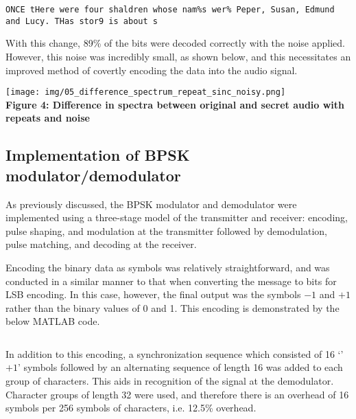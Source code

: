 \documentclass{article}
\begin{document}
\begin{verbatim}
ONCE tHere were four shaldren whose nam%s wer% Peper, Susan, Edmund 
and Lucy. THas stor9 is about s
\end{verbatim}

With this change, 89\% of the bits were decoded correctly with the noise
applied. However, this noise was incredibly small, as shown below, and this 
necessitates an improved method of covertly encoding the data into the audio
signal.

\begin{center}
  \texttt{[image: img/05\_difference\_spectrum\_repeat\_sinc\_noisy.png]} \\
  \textbf{Figure 4: Difference in spectra between original and secret audio with repeats and noise}
\end{center}

\subsection{Implementation of BPSK modulator/demodulator}

As previously discussed, the BPSK modulator and demodulator were implemented
using a three-stage model of the transmitter and receiver: encoding, pulse
shaping, and modulation at the transmitter followed by demodulation, pulse
matching, and decoding at the receiver.

\vspace{6pt}

Encoding the binary data as symbols was relatively straightforward, and was
conducted in a similar manner to that when converting the message to bits for
LSB encoding. In this case, however, the final output was the symbols $-1$ and
$+1$ rather than the binary values of 0 and 1. This encoding is demonstrated
by the below MATLAB code.

\inputminted[xleftmargin=24pt, linenos=true, breaklines, firstline=32, lastline=39]{matlab}{src/encode_message_BPSK.m}

In addition to this encoding, a synchronization sequence which consisted of 16
`'$+1$' symbols followed by an alternating sequence of length 16 was added to
each group of characters. This aids in recognition of the signal at the
demodulator. Character groups of length 32 were used, and therefore there is an
overhead of 16 symbols per 256 symbols of characters, i.e. 12.5\% overhead.

\inputminted[xleftmargin=24pt, linenos=true, breaklines, firstline=41, lastline=49]{matlab}{src/encode_message_BPSK.m}
\end{document}
